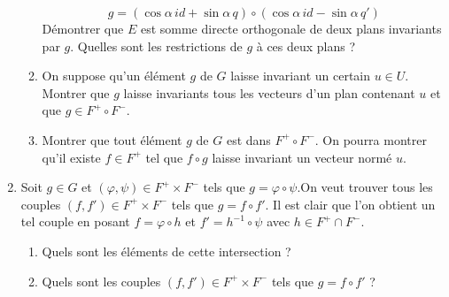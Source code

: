 \begin{enumerate}
\begin{enumerate}
\[g=(\cos \alpha \, id + \sin \alpha \, q)\circ(\cos \alpha \, id - \sin \alpha \, q')\]
Démontrer que $E$ est somme directe orthogonale de deux plans invariants par $g$. Quelles sont les restrictions de $g$ à ces deux plans ?
\item On suppose qu'un élément $g$ de $G$ laisse invariant un certain $u\in U$. Montrer que $g$ laisse invariants tous les vecteurs d'un plan contenant $u$ et que $g\in F^+ \circ F^-$.
\item Montrer que tout élément $g$ de $G$ est dans $F^+ \circ F^-$. On pourra montrer qu'il existe $f\in F^+$ tel que $f\circ g$ laisse invariant un vecteur normé $u$.
\end{enumerate}
\item Soit $g \in G$ et $(\varphi,\psi)\in F^+ \times F^-$ tels que $g=\varphi \circ \psi$.On veut trouver tous les couples $(f,f')\in F^+ \times F^-$ tels que $g=f \circ f'$.\newline
Il est clair que l'on obtient un tel couple en posant $f=\varphi \circ h$ et $f'=h^{-1}\circ \psi$ avec $h\in F^+\cap F^-$.
\begin{enumerate}
\item Quels sont les éléments de cette intersection ?
\item Quels sont les couples $(f,f')\in F^+ \times F^-$ tels que $g=f \circ f'$ ?
\end{enumerate} 
\end{enumerate}
